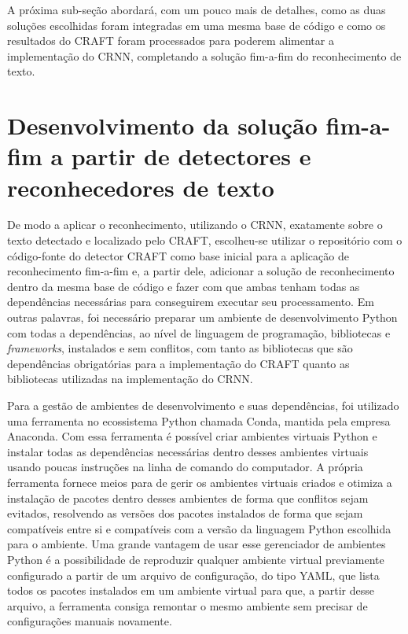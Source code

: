 A próxima sub-seção abordará, com um pouco mais de detalhes, como as duas soluções escolhidas foram integradas em uma mesma base de código e como os 
resultados do CRAFT foram processados para poderem alimentar a implementação do CRNN, completando a solução fim-a-fim do reconhecimento de texto. 

\section{Desenvolvimento da solução fim-a-fim a partir de detectores e reconhecedores de texto}\label{sec:metodologia_desenvolvimento}

De modo a aplicar o reconhecimento, utilizando o CRNN, exatamente sobre o texto detectado e localizado pelo CRAFT, escolheu-se utilizar o repositório com 
o código-fonte do detector CRAFT como base inicial para a aplicação de reconhecimento fim-a-fim e, a partir dele, adicionar a solução de reconhecimento 
dentro da mesma base de código e fazer com que ambas tenham todas as dependências necessárias para conseguirem executar seu processamento. Em outras palavras, 
foi necessário preparar um ambiente de desenvolvimento Python com todas a dependências, ao nível de linguagem de programação, bibliotecas e 
\textit{frameworks}, instalados e sem conflitos, com tanto as bibliotecas que são dependências obrigatórias para a implementação do CRAFT quanto as 
bibliotecas utilizadas na implementação do CRNN.

Para a gestão de ambientes de desenvolvimento e suas dependências, foi utilizado uma ferramenta no ecossistema Python chamada Conda, mantida pela empresa 
Anaconda. Com essa ferramenta é possível criar ambientes virtuais Python e instalar todas as dependências necessárias dentro desses ambientes virtuais 
usando poucas instruções na linha de comando do computador. A própria ferramenta fornece meios para de gerir os ambientes virtuais criados e otimiza a 
instalação de pacotes dentro desses ambientes de forma que conflitos sejam evitados, resolvendo as versões dos pacotes instalados de forma que sejam 
compatíveis entre si e compatíveis com a versão da linguagem Python escolhida para o ambiente. Uma grande vantagem de usar esse gerenciador de ambientes 
Python é a possibilidade de reproduzir qualquer ambiente virtual previamente configurado a partir de um arquivo de configuração, do tipo YAML, que lista 
todos os pacotes instalados em um ambiente virtual para que, a partir desse arquivo, a ferramenta consiga remontar o mesmo ambiente sem precisar de 
configurações manuais novamente.

